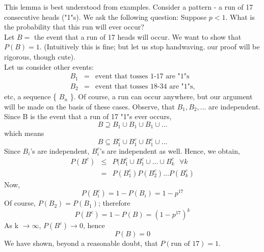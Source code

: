 
This lemma is best understood from examples.
Consider a pattern - a run of 17 consecutive heads ("1"s).
We ask the following question:
Suppose $p<1$. What is the probability that this run will
ever occur? \\
Let $B =$ the event that a run of 17 heads will occur.
We want to show that $P(B) =1$.
(Intuitively this is fine; but let us stop handwaving.
our proof will be rigorous, though cute).\\
Let us consider other events:
\begin{eqnarray*}
B_{1} &=& \mbox{event that tosses 1-17  are "1"s} \\
B_{2} &=& \mbox{event that tosses 18-34 are "1"s,}
\end{eqnarray*}
etc, a sequence \{ $B_{n}$ \}. 
Of course, a run can occur anywhere, but our argument
will be made on the basis of these cases.
Observe, that $B_{1},B_{2}, \ldots$ are independent.
Since B is the event that a run of 17 "1"s {\bf} ever occurs,
\begin{equation}
B \supseteq B_{1} \cup B_{1} \cup B_{1} \cup \ldots
\end{equation}
which means
\begin{equation}
B \subseteq B_{1}^{c} \cup B_{1}^{c} \cup B_{1}^{c} \cup \ldots
\end{equation}
Since $B_{i}$'s are independent, $B_{i}^{c}$'s are independent as well.
Hence, we obtain,
\begin{eqnarray*}
P(B^{c}) & \leq & P( B_{1}^{c} \cup B_{1}^{c} \cup \ldots \cup B_{k}^{c}
\mbox{ } \forall k \\
& = & P(B_{1}^{c})P(B_{2}^{c}) \ldots P(B_{k}^{c})
\end{eqnarray*}
Now,
\begin{equation}
P(B_{i}^{c}) = 1-P(B_{i}) = 1-p^{17}
\end{equation}
Of course, $P(B_{2})=P(B_{1})$; therefore
\begin{equation}
P(B^{c}) = 1-P(B) = (1-p^{17})^k
\end{equation}
As k $\rightarrow \infty$, $P(B^{c}) \rightarrow 0$,
hence
\begin{equation}
P(B) = 0
\end{equation}
We have shown, beyond a reasonable doubt, that $P(\mbox{run of 17}) = 1$.

